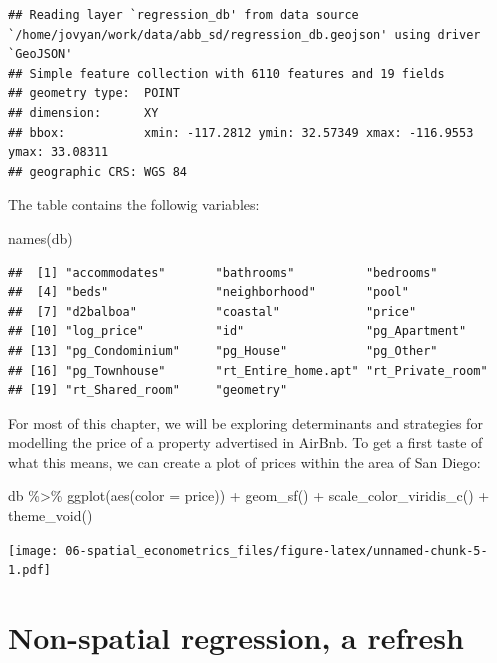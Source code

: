 \documentclass[
]{book}
\newenvironment{Shaded}{\begin{snugshade}}{\end{snugshade}}
\newcommand{\AttributeTok}[1]{\textcolor[rgb]{0.77,0.63,0.00}{#1}}
\newcommand{\FunctionTok}[1]{\textcolor[rgb]{0.00,0.00,0.00}{#1}}
\newcommand{\NormalTok}[1]{#1}
\newcommand{\SpecialCharTok}[1]{\textcolor[rgb]{0.00,0.00,0.00}{#1}}
\begin{document}
\begin{verbatim}
## Reading layer `regression_db' from data source `/home/jovyan/work/data/abb_sd/regression_db.geojson' using driver `GeoJSON'
## Simple feature collection with 6110 features and 19 fields
## geometry type:  POINT
## dimension:      XY
## bbox:           xmin: -117.2812 ymin: 32.57349 xmax: -116.9553 ymax: 33.08311
## geographic CRS: WGS 84
\end{verbatim}

The table contains the followig variables:

\begin{Shaded}
\begin{Highlighting}[]
\FunctionTok{names}\NormalTok{(db)}
\end{Highlighting}
\end{Shaded}

\begin{verbatim}
##  [1] "accommodates"       "bathrooms"          "bedrooms"          
##  [4] "beds"               "neighborhood"       "pool"              
##  [7] "d2balboa"           "coastal"            "price"             
## [10] "log_price"          "id"                 "pg_Apartment"      
## [13] "pg_Condominium"     "pg_House"           "pg_Other"          
## [16] "pg_Townhouse"       "rt_Entire_home.apt" "rt_Private_room"   
## [19] "rt_Shared_room"     "geometry"
\end{verbatim}

For most of this chapter, we will be exploring determinants and strategies for modelling the price of a property advertised in AirBnb. To get a first taste of what this means, we can create a plot of prices within the area of San Diego:

\begin{Shaded}
\begin{Highlighting}[]
\NormalTok{db }\SpecialCharTok{\%\textgreater{}\%}
  \FunctionTok{ggplot}\NormalTok{(}\FunctionTok{aes}\NormalTok{(}\AttributeTok{color =}\NormalTok{ price)) }\SpecialCharTok{+}
  \FunctionTok{geom\_sf}\NormalTok{() }\SpecialCharTok{+} 
  \FunctionTok{scale\_color\_viridis\_c}\NormalTok{() }\SpecialCharTok{+}
  \FunctionTok{theme\_void}\NormalTok{()}
\end{Highlighting}
\end{Shaded}

\texttt{[image: 06-spatial\_econometrics\_files/figure-latex/unnamed-chunk-5-1.pdf]}

\hypertarget{non-spatial-regression-a-refresh}{%
\section{Non-spatial regression, a refresh}\label{non-spatial-regression-a-refresh}}
\end{document}
